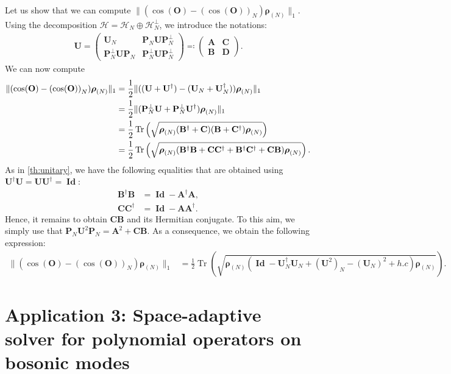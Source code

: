\documentclass[a4paper,onecolumn,amsmath,amssymb,amsfonts,accepted=2026-03-06]{quantumarticle}
\newcommand{\Id}{\operatorname{\mathbf{Id}}}
\newcommand{\xH}{\mathcal{H}}
\newcommand{\xtr}[1]{\operatorname{Tr}\left(#1 \right)}
\newcommand{\Proj}[1]{\mathbf{P}_{#1}}
\newcommand{\rN}{{\boldsymbol{\rho}_{(N)}}}
\newcommand{\Uop}{\mathbf{U}}
\begin{document}
Let us show that we can compute $\|(\cos(\mathbf{O}) - {(\cos(\mathbf{O}))}_N) \rN\|_1$. Using the decomposition $\xH=\xH_N\oplus \xH_N^\perp$, we introduce the notations: 
\begin{align}
    \Uop=
    \begin{pmatrix}
        \Uop_N&\Proj{N} \Uop \Proj{N}^\perp \\
        \Proj{N}^\perp \Uop \Proj{N}&\Proj{N}^\perp \Uop \Proj{N}^\perp 
    \end{pmatrix}\eqqcolon
    \begin{pmatrix}
        \mathbf{A}&\mathbf{C} \\
        \mathbf{B}&\mathbf{D}
    \end{pmatrix}.
\end{align}
We can now compute
\begin{align}
    \notag \|(\cos(\mathbf{O}) - {(\cos(\mathbf{O}))}_N) \rN\|_1 &= \frac12 \|((\Uop + \Uop^\dag) - (\Uop_N + \Uop_N^\dagger) )\rN\|_1\\
    \notag &= \frac12 \|(\Proj{N}^\perp \Uop + \Proj{N}^\perp \Uop^\dag)\rN\|_1\\
    \notag &= \frac12 \xtr{\sqrt{\rN(\mathbf{B}^\dagger + \mathbf{C})(\mathbf{B} + \mathbf{C}^\dagger)\rN}}\\
    &= \frac12 \xtr{\sqrt{\rN(\mathbf{B}^\dagger \mathbf{B} + \mathbf{C} \mathbf{C}^\dagger + \mathbf{B}^\dagger \mathbf{C}^\dagger + \mathbf{C}\mathbf{B})\rN}}.
\end{align}
As in \cref{th:unitary}, we have the following equalities that are obtained using $\Uop^\dag \Uop = \Uop \Uop^\dag = \Id$:
\begin{align}
        \mathbf{B}^\dagger \mathbf{B} &= \Id - \mathbf{A}^\dagger \mathbf{A},\\
        \mathbf{C} \mathbf{C}^\dagger &= \Id - \mathbf{A} \mathbf{A}^\dagger.
\end{align}
Hence, it remains to obtain $\mathbf{C}\mathbf{B}$ and its Hermitian conjugate. To this aim, we simply use that $\Proj{N}\Uop^2\Proj{N}=\mathbf{A}^2 + \mathbf{C}\mathbf{B}$. As a consequence, we obtain the following expression:
\begin{align}
    \|(\cos(\mathbf{O}) - {(\cos(\mathbf{O}))}_N) \rN\|_1 &= \frac12 \xtr{\sqrt{\rN(\Id - \Uop_N^\dagger \Uop_N + {(\Uop^2)}_N - (\Uop_N)^2 + h.c )\rN}}.
\end{align}


\section{Application 3: Space-adaptive solver for polynomial operators on bosonic modes}
\label{sec_faster}
\end{document}

